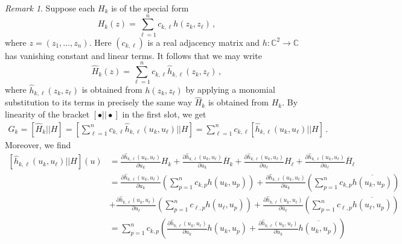 \documentclass[12pt]{article}
\theoremstyle{plain}
\theoremstyle{definition}
\theoremstyle{remark}
\newtheorem{remk}[thr]{Remark}
\theoremstyle{remark}
\begin{document}
\begin{remk}\label{sumsoftermsinH}
Suppose each $H_k$ is of the special form 
\begin{equation}\label{simplelinkform}
H_k(z) = \sum_{\ell=1}^nc_{k,\ell} h(z_{k}, z_{\ell})\, ,
\end{equation}
where $z = (z_1, \dots, z_n)$. Here $(c_{k,\ell})$ is a real adjacency matrix and $h: \mathbb{C}^2 \rightarrow \mathbb{C}$ has vanishing constant and linear terms. It follows that we may write
\begin{equation}
\widehat{H}_k(z) = \sum_{\ell=1}^nc_{k,\ell} \widehat{h}_{k,\ell}(z_{k}, z_{\ell})\, ,
\end{equation}
where $\widehat{h}_{k,\ell}(z_k, z_{\ell})$ is obtained from $h(z_k, z_{\ell})$ by applying a monomial substitution to its terms in precisely the same way $\widehat{H}_k$ is obtained from $H_k$. By linearity of the bracket $[\bullet||\bullet]$ in the first slot, we get
\begin{align}\label{0of1G2G}
G_k = [\widehat{H}_k||{H}] = [\sum_{\ell=1}^nc_{k,\ell} \widehat{h}_{k,\ell}(u_{k}, u_{\ell})||H] = \sum_{\ell=1}^nc_{k,\ell} [\widehat{h}_{k,\ell}(u_{k}, u_{\ell})||H] \, .
\end{align}
Moreover, we find 
\begin{align}\label{1of1G2G}
 [\widehat{h}_{k,\ell}(u_{k}, u_{\ell})||H](u) &= \frac{\partial \widehat{h}_{k,\ell}(u_{k}, u_{\ell})}{\partial u_{k}}H_k + \frac{\partial \widehat{h}_{k,\ell}(u_{k}, u_{\ell})}{\partial \overline{u}_{k}}\overline{H}_k + \frac{\partial \widehat{h}_{k,\ell}(u_{k}, u_{\ell})}{\partial u_{\ell}}H_{\ell} + \frac{\partial \widehat{h}_{k,\ell}(u_{k}, u_{\ell})}{\partial \overline{u}_{\ell}}\overline{H}_{\ell} \\ \nonumber
 &= \frac{\partial \widehat{h}_{k,\ell}(u_{k}, u_{\ell})}{\partial u_{k}}\left(\sum_{p=1}^nc_{k,p} h(u_{k}, u_p)\right) + \frac{\partial \widehat{h}_{k,\ell}(u_{k}, u_{\ell})}{\partial \overline{u}_{k}}\left(\sum_{p=1}^nc_{k,p} \overline{h(u_{k}, u_p)}\right) \\ \nonumber 
 &+ \frac{\partial \widehat{h}_{k,\ell}(u_{k}, u_{\ell})}{\partial u_{\ell}}\left(\sum_{p=1}^nc_{\ell,p} h(u_{\ell}, u_p)\right) + \frac{\partial \widehat{h}_{k,\ell}(u_{k}, u_{\ell})}{\partial \overline{u}_{\ell}}\left(\sum_{p=1}^nc_{\ell,p} \overline{h(u_{\ell}, u_p)}\right) \\ \nonumber 
 &=\sum_{p=1}^nc_{k,p} \left( \frac{\partial \widehat{h}_{k,\ell}(u_{k}, u_{\ell})}{\partial u_{k}} h(u_{k}, u_p) + \frac{\partial \widehat{h}_{k,\ell}(u_{k}, u_{\ell})}{\partial \overline{u}_{k}} \overline{h(u_{k}, u_p)}\right) \\ \nonumber 

\end{align}
\end{remk}
\end{document}

